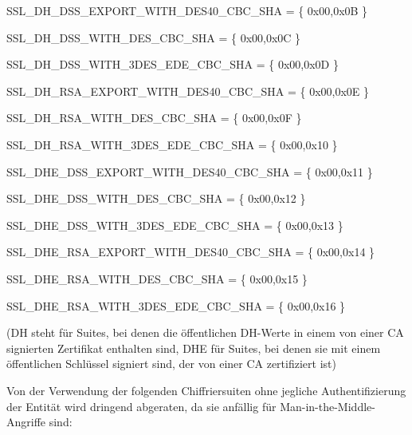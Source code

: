 \documentclass[a4paper]{article}
\begin{document}
\begin{multicols}{3}
\begin{itemize*}
\begin{itemize*}
                  \begin{itemize*}
                        \item SSL\_DH\_DSS\_EXPORT\_WITH\_DES40\_CBC\_SHA = \{ 0x00,0x0B \}
                        \item SSL\_DH\_DSS\_WITH\_DES\_CBC\_SHA = \{ 0x00,0x0C \}
                        \item SSL\_DH\_DSS\_WITH\_3DES\_EDE\_CBC\_SHA = \{ 0x00,0x0D \}
                        \item SSL\_DH\_RSA\_EXPORT\_WITH\_DES40\_CBC\_SHA = \{ 0x00,0x0E \}
                        \item SSL\_DH\_RSA\_WITH\_DES\_CBC\_SHA = \{ 0x00,0x0F \}
                        \item SSL\_DH\_RSA\_WITH\_3DES\_EDE\_CBC\_SHA = \{ 0x00,0x10 \}
                        \item SSL\_DHE\_DSS\_EXPORT\_WITH\_DES40\_CBC\_SHA = \{ 0x00,0x11 \}
                        \item SSL\_DHE\_DSS\_WITH\_DES\_CBC\_SHA = \{ 0x00,0x12 \}
                        \item SSL\_DHE\_DSS\_WITH\_3DES\_EDE\_CBC\_SHA = \{ 0x00,0x13 \}
                        \item SSL\_DHE\_RSA\_EXPORT\_WITH\_DES40\_CBC\_SHA = \{ 0x00,0x14 \}
                        \item SSL\_DHE\_RSA\_WITH\_DES\_CBC\_SHA = \{ 0x00,0x15 \}
                        \item SSL\_DHE\_RSA\_WITH\_3DES\_EDE\_CBC\_SHA = \{ 0x00,0x16 \}
                  \end{itemize*}
            \end{itemize*}

            (DH steht für Suites, bei denen die öffentlichen DH-Werte in einem von
            einer CA signierten Zertifikat enthalten sind, DHE für Suites, bei denen
            sie mit einem öffentlichen Schlüssel signiert sind, der von einer CA
            zertifiziert ist)

            \begin{itemize*}
                  \item
                  Von der Verwendung der folgenden Chiffriersuiten ohne jegliche
                  Authentifizierung der Entität wird dringend abgeraten, da sie anfällig
                  für Man-in-the-Middle-Angriffe sind:


\end{itemize*}
\end{itemize*}
\end{multicols}
\end{document}
